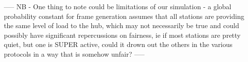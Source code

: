 \documentclass[twocolumn]{article}
\begin{document}
-----
NB -
One thing to note could be limitations of our simulation - a global probability constant 
for frame generation assumes that all stations are providing the same level of load to 
the hub, which may not necessarily be true and could possibly have significant
repercussions on fairness, ie if most stations are pretty quiet, but one is SUPER active,
could it drown out the others in the various protocols in a way that is somehow unfair?
-----
\end{document}
